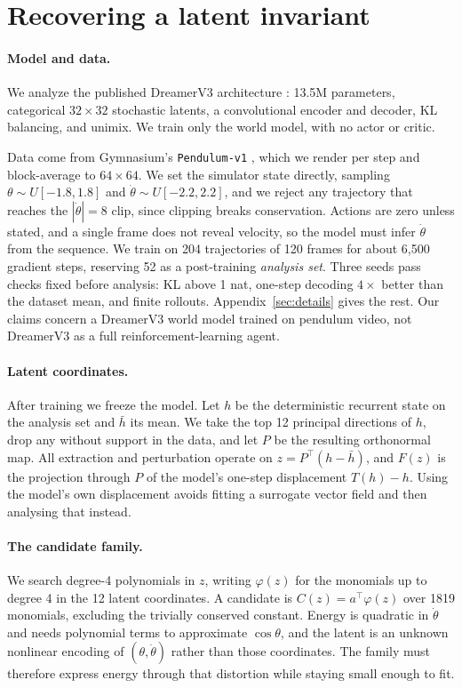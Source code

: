 \section{Recovering a latent invariant}
\label{sec:setup}

\paragraph{Model and data.} We analyze the published DreamerV3 architecture
\citep{hafner2023dreamerv3}: 13.5M parameters, categorical $32\times32$ stochastic latents, a
convolutional encoder and decoder, KL balancing, and unimix. We train only the world model, with no
actor or critic.

Data come from Gymnasium's \texttt{Pendulum-v1} \citep{towers2024gymnasium}, which we render per step
and block-average to $64\times64$. We set the simulator state directly, sampling
$\theta\sim U[-1.8,1.8]$ and $\dot\theta\sim U[-2.2,2.2]$, and we reject any trajectory that reaches
the $|\dot\theta|=8$ clip, since clipping breaks conservation. Actions are zero unless stated, and a
single frame does not reveal velocity, so the model must infer $\dot\theta$ from the sequence. We
train on 204 trajectories of 120 frames for about 6{,}500 gradient steps, reserving 52 as a
post-training \emph{analysis set}. Three seeds pass checks fixed before analysis: KL above 1 nat,
one-step decoding $4\times$ better than the dataset mean, and finite rollouts.
Appendix~\ref{sec:details} gives the rest. Our claims concern a DreamerV3 world model trained on
pendulum video, not DreamerV3 as a full reinforcement-learning agent.

\paragraph{Latent coordinates.} After training we freeze the model. Let $h$ be the deterministic
recurrent state on the analysis set and $\bar h$ its mean. We take the top 12 principal directions of
$h$, drop any without support in the data, and let $P$ be the resulting orthonormal map. All
extraction and perturbation operate on $z = P^\top(h-\bar h)$, and $F(z)$ is the projection through
$P$ of the model's one-step displacement $T(h)-h$. Using the model's own displacement avoids fitting
a surrogate vector field and then analysing that instead.

\paragraph{The candidate family.} We search degree-4 polynomials in $z$, writing $\varphi(z)$ for the
monomials up to degree 4 in the 12 latent coordinates. A candidate is $C(z) = a^\top\varphi(z)$ over
1819 monomials, excluding the trivially conserved constant. Energy is quadratic in $\dot\theta$ and
needs polynomial terms to approximate $\cos\theta$, and the latent is an unknown nonlinear encoding
of $(\theta,\dot\theta)$ rather than those coordinates. The family must therefore express energy
through that distortion while staying small enough to fit.

